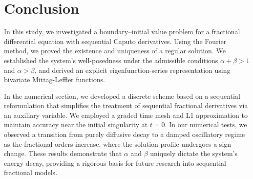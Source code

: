 \documentclass{amsart}
\numberwithin{equation}{section}
\begin{document}
\section{Conclusion}\label{jumaeva:sec:6}
\par In this study, we investigated a boundary–initial value problem for a fractional differential equation with sequential Caputo derivatives. Using the Fourier method, we proved the existence and uniqueness of a regular solution. We established the system's well-posedness under the admissible conditions $\alpha+\beta>1$ and $\alpha>\beta$, and derived an explicit eigenfunction-series representation using bivariate Mittag-Leffler functions.

In the numerical section, we developed a discrete scheme based on a sequential reformulation that simplifies the treatment of sequential fractional derivatives via an auxiliary variable. We employed a graded time mesh and L1 approximation to maintain accuracy near the initial singularity at $t=0$. In our numerical tests, we observed a transition from purely diffusive decay to a damped oscillatory regime as the fractional orders increase, where the solution profile undergoes a sign change. These results demonstrate that $\alpha$ and $\beta$ uniquely dictate the system's energy decay, providing a rigorous basis for future research into sequential fractional models.
\end{document}
